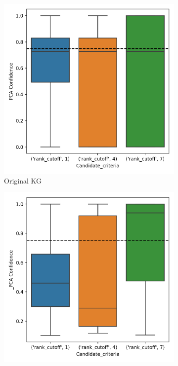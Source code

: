 \begin{figure}[htb]
\centering
\begin{subfigure}{.5\textwidth}
  \centering
  \includegraphics[width=1\linewidth]{figures/results/ranks/PCA-rank_wn18rr.png}
  \caption{Original KG}
  \label{fig:PCA-rank_wn18rr_boxplot_sub}
\end{subfigure}%
\begin{subfigure}{.5\textwidth}
  \centering
  \includegraphics[width=1\linewidth]{figures/results/ranks/_PCA-rank_wn18rr.png}

\end{subfigure}
\end{figure}
